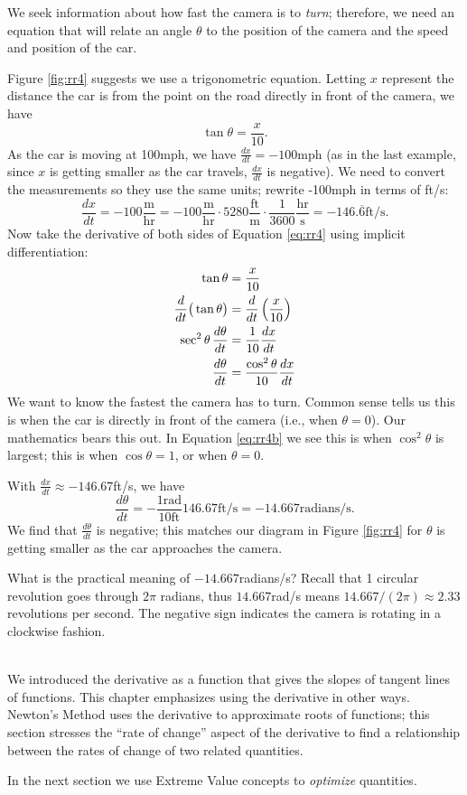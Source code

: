 {We seek information about how fast the camera is to \textit{turn}; therefore, we need an equation that will relate an angle $\theta$ to the position of the camera and the speed and position of the car.

Figure \ref{fig:rr4} suggests we use a trigonometric equation. Letting $x$ represent the distance the car is from the point on the road directly in front of the camera, we have \begin{equation}\tan \theta = \frac{x}{10}.\label{eq:rr4}\end{equation} As the car is moving at 100mph, we have $\frac{dx}{dt} = -100$mph (as in the last example, since $x$ is getting smaller as the car travels, $\frac{dx}{dt}$ is negative). We need to convert the measurements so they use the same units; rewrite -100mph in terms of ft/s:
$$\frac{dx}{dt} = -100\frac{\text{m}}{\text{hr}} = -100\frac{\text{m}}{\text{hr}}\cdot5280\frac{\text{ft}}{\text{m}}\cdot\frac{1}{3600}\frac{\text{hr}}{\text{s}} =-146.\overline{6}\text{ft/s}.$$
Now take the derivative of both sides of Equation \eqref{eq:rr4} using implicit differentiation:
\begin{align}
		\tan \theta &= \frac{x}{10} \notag \\
		\frac{d}{dt}\big(\tan \theta\big) &= \frac{d}{dt}\left(\frac{x}{10}\right)\notag \\
		\sec^2\theta\,\frac{d\theta}{dt} &= \frac{1}{10}\frac{dx}{dt}\notag\\
		\frac{d\theta}{dt} &= \frac{\cos^2\theta}{10}\frac{dx}{dt}\label{eq:rr4b}
\end{align}
We want to know the fastest the camera has to turn. Common sense tells us this is when the car is directly in front of the camera (i.e., when $\theta = 0$). Our mathematics bears this out. In Equation \eqref{eq:rr4b} we see this is when $\cos^2\theta$ is largest; this is when $\cos \theta = 1$, or when $\theta = 0$.

With $\frac{dx}{dt} \approx -146.67$ft/s, we have 
	$$\frac{d\theta}{dt} = -\frac{1\text{rad}}{10\text{ft}}146.67\text{ft/s} = -14.667\text{radians/s}.$$
We find that $\frac{d\theta}{dt}$ is negative; this matches our diagram in Figure \ref{fig:rr4} for $\theta$ is getting smaller as the car approaches the camera.	
	
What is the practical meaning of $-14.667$radians/s? Recall that 1 circular revolution goes through $2\pi$ radians, thus $14.667$rad/s means $14.667/(2\pi)\approx 2.33$ revolutions per second. The negative sign indicates the camera is rotating in a clockwise fashion.
}\\

We introduced the derivative as a function that gives the slopes of tangent lines of functions. This chapter emphasizes using the derivative in other ways. Newton's Method uses the derivative to approximate roots of functions; this section stresses the ``rate of change'' aspect of the derivative to find a relationship between the rates of change of two related quantities. 

In the next section we use Extreme Value concepts to \textit{optimize} quantities. 

